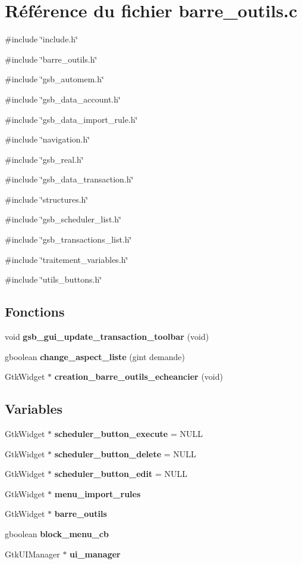 \section{Référence du fichier barre\_\-outils.c}
\label{barre__outils_8c}
{\ttfamily \#include \char`\"{}include.h\char`\"{}}\par
{\ttfamily \#include \char`\"{}barre\_\-outils.h\char`\"{}}\par
{\ttfamily \#include \char`\"{}gsb\_\-automem.h\char`\"{}}\par
{\ttfamily \#include \char`\"{}gsb\_\-data\_\-account.h\char`\"{}}\par
{\ttfamily \#include \char`\"{}gsb\_\-data\_\-import\_\-rule.h\char`\"{}}\par
{\ttfamily \#include \char`\"{}navigation.h\char`\"{}}\par
{\ttfamily \#include \char`\"{}gsb\_\-real.h\char`\"{}}\par
{\ttfamily \#include \char`\"{}gsb\_\-data\_\-transaction.h\char`\"{}}\par
{\ttfamily \#include \char`\"{}structures.h\char`\"{}}\par
{\ttfamily \#include \char`\"{}gsb\_\-scheduler\_\-list.h\char`\"{}}\par
{\ttfamily \#include \char`\"{}gsb\_\-transactions\_\-list.h\char`\"{}}\par
{\ttfamily \#include \char`\"{}traitement\_\-variables.h\char`\"{}}\par
{\ttfamily \#include \char`\"{}utils\_\-buttons.h\char`\"{}}\par
\subsection*{Fonctions}
\begin{DoxyCompactItemize}
\item 
void {\bf gsb\_\-gui\_\-update\_\-transaction\_\-toolbar} (void)
\item 
gboolean {\bf change\_\-aspect\_\-liste} (gint demande)
\item 
GtkWidget $\ast$ {\bf creation\_\-barre\_\-outils\_\-echeancier} (void)
\end{DoxyCompactItemize}
\subsection*{Variables}
\begin{DoxyCompactItemize}
\item 
GtkWidget $\ast$ {\bf scheduler\_\-button\_\-execute} = NULL
\item 
GtkWidget $\ast$ {\bf scheduler\_\-button\_\-delete} = NULL
\item 
GtkWidget $\ast$ {\bf scheduler\_\-button\_\-edit} = NULL
\item 
GtkWidget $\ast$ {\bf menu\_\-import\_\-rules}
\item 
GtkWidget $\ast$ {\bf barre\_\-outils}
\item 
gboolean {\bf block\_\-menu\_\-cb}
\item 
GtkUIManager $\ast$ {\bf ui\_\-manager}
\end{DoxyCompactItemize}


